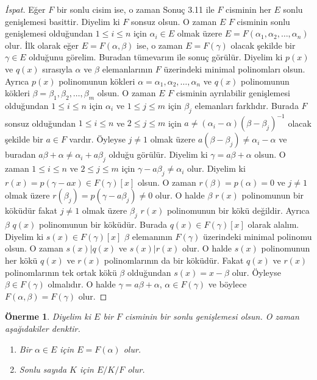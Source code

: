 \documentclass[draft]{article}
\newtheorem{prop}[thm]{Önerme}
\theoremstyle{definition}
\theoremstyle{remark}
\begin{document}
    	    \begin{proof}[İspat]
    	        Eğer $F$ bir sonlu cisim ise, o zaman Sonuç 3.11 ile $F$ cisminin her $E$ sonlu genişlemesi basittir. Diyelim ki $F$ sonsuz olsun. O zaman $E$ $F$ cisminin sonlu genişlemesi olduğundan $1 \leq i \leq n$ için $\alpha_i \in E$ olmak üzere $E = F(\alpha_1, \alpha_2, \dots, \alpha_n)$ olur. İlk olarak eğer $E = F(\alpha, \beta)$ ise, o zaman $E = F(\gamma)$ olacak şekilde bir $\gamma \in E$ olduğunu görelim. Buradan tümevarım ile sonuç görülür. Diyelim ki $p(x)$ ve $q(x)$ sırasıyla $\alpha$ ve $\beta$ elemanlarının $F$ üzerindeki minimal polinomları olsun. Ayrıca $p(x)$ polinomunun kökleri $\alpha = \alpha_1, \alpha_2, \dots, \alpha_n$ ve $q(x)$ polinomunun kökleri $\beta = \beta_1, \beta_2, \dots, \beta_m$ olsun. O zaman $E$ $F$ cisminin ayrılabilir genişlemesi olduğundan $1 \leq i \leq n$ için $\alpha_i$ ve $1 \leq j \leq m$ için $\beta_j$ elemanları farklıdır. Burada $F$ sonsuz olduğundan $1 \leq i \leq n$ ve $2 \leq j \leq m$ için $a \neq (\alpha_i - \alpha)(\beta - \beta_j)^{-1}$ olacak şekilde bir $a \in F$ vardır. Öyleyse $j \neq 1$ olmak üzere $a(\beta - \beta_j) \neq \alpha_i - \alpha$ ve buradan $a\beta + \alpha \neq \alpha_i + a\beta_j$ olduğu görülür. Diyelim ki $\gamma = a\beta + \alpha$ olsun. O zaman $1 \leq i \leq n$ ve $2 \leq j \leq m$ için $\gamma - a\beta_j \neq \alpha_i$ olur. Diyelim ki $r(x) = p(\gamma - ax) \in F(\gamma)[x]$ olsun. O zaman $r(\beta) = p(\alpha) = 0$ ve $j \neq 1$ olmak üzere $r(\beta_j) = p(\gamma - a\beta_j) \neq 0$ olur. O halde $\beta$ $r(x)$ polinomunun bir köküdür fakat $j \neq 1$ olmak üzere $\beta_j$ $r(x)$ polinomunun bir kökü değildir. Ayrıca $\beta$ $q(x)$ polinomunun bir köküdür. Burada $q(x) \in F(\gamma)[x]$ olarak alalım. Diyelim ki $s(x) \in F(\gamma)[x]$ $\beta$ elemanının $F(\gamma)$ üzerindeki minimal polinomu olsun. O zaman $s(x) | q(x)$ ve $s(x) | r(x)$ olur. O halde $s(x)$ polinomunun her kökü $q(x)$ ve $r(x)$ polinomlarının da bir köküdür. Fakat $q(x)$ ve $r(x)$ polinomlarının tek ortak kökü $\beta$ olduğundan $s(x) = x - \beta$ olur. Öyleyse $\beta \in F(\gamma)$ olmalıdır. O halde $\gamma = a\beta + \alpha$, $\alpha \in F(\gamma)$ ve böylece $F(\alpha, \beta) = F(\gamma)$ olur.
    	    \end{proof}
    	    
    	    \begin{prop}
    	        Diyelim ki $E$ bir $F$ cisminin bir sonlu genişlemesi olsun. O zaman aşağıdakiler denktir.
    	         \begin{enumerate}
				\renewcommand{\labelenumi}{(\roman{enumi})}
				    \item Bir $\alpha \in E$ için $E = F(\alpha)$ olur.
				    \item Sonlu sayıda $K$ için $E/K/F$ olur.
				\end{enumerate}
    	    \end{prop}
    	    
\end{document}
